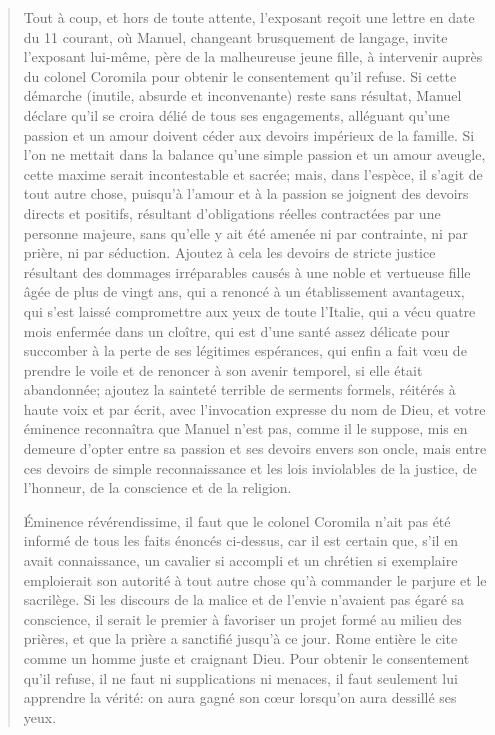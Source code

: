 \begin{quote}
Tout à coup, et hors de toute attente, l'exposant reçoit une lettre en date du 11 courant, où Manuel, changeant brusquement de langage, invite l'exposant lui-même, père de la malheureuse jeune fille, à intervenir auprès du colonel Coromila pour obtenir le consentement qu'il refuse. Si cette démarche (inutile, absurde et inconvenante) reste sans résultat, Manuel déclare qu'il se croira délié de tous ses engagements, alléguant qu'une passion et un amour doivent céder aux devoirs impérieux de la famille. Si l'on ne mettait dans la balance qu'une simple passion et un amour aveugle, cette maxime serait incontestable et sacrée; mais, dans l'espèce, il s'agit de tout autre chose, puisqu'à l'amour et à la passion se joignent des devoirs directs et positifs, résultant d'obligations réelles contractées par une personne majeure, sans qu'elle y ait été amenée ni par contrainte, ni par prière, ni par séduction. Ajoutez à cela les devoirs de stricte justice résultant des dommages irréparables causés à une noble et vertueuse fille âgée de plus de vingt ans, qui a renoncé à un établissement avantageux, qui s'est laissé compromettre aux yeux de toute l'Italie, qui a vécu quatre mois enfermée dans un cloître, qui est d'une santé assez délicate pour succomber à la perte de ses légitimes espérances, qui enfin a fait v\oe{}u de prendre le voile et de renoncer à son avenir temporel, si elle était abandonnée; ajoutez la sainteté terrible de serments formels, réitérés à haute voix et par écrit, avec l'invocation expresse du nom de Dieu, et votre éminence reconnaîtra que Manuel n'est pas, comme il le suppose, mis en demeure d'opter entre sa passion et ses devoirs envers son oncle, mais entre ces devoirs de simple reconnaissance et les lois inviolables de la justice, de l'honneur, de la conscience et de la religion.

Éminence révérendissime, il faut que le colonel Coromila n'ait pas été informé de tous les faits énoncés ci-dessus, car il est certain que, s'il en avait connaissance, un cavalier si accompli et un chrétien si exemplaire emploierait son autorité à tout autre chose qu'à commander le parjure et le sacrilège. Si les discours de la malice et de l'envie n'avaient pas égaré sa conscience, il serait le premier à favoriser un projet formé au milieu des prières, et que la prière a sanctifié jusqu'à ce jour. Rome entière le cite comme un homme juste et craignant Dieu. Pour obtenir le consentement qu'il refuse, il ne faut ni supplications ni menaces, il faut seulement lui apprendre la vérité: on aura gagné son c\oe{}ur lorsqu'on aura dessillé ses yeux.


\end{quote}
